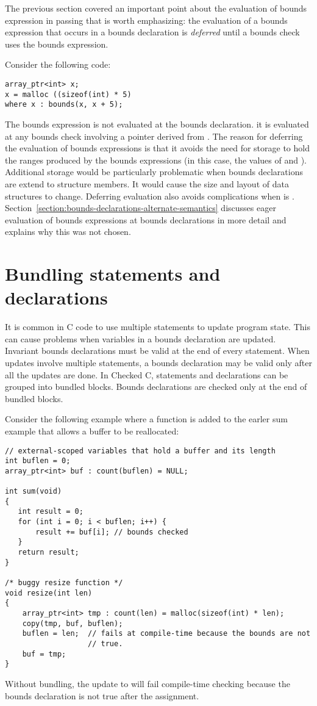 The previous section covered an important point about the evaluation of
bounds expression in passing that is worth emphasizing:
the evaluation of a bounds expression that occurs in
a bounds declaration is {\em deferred} until a bounds check uses the
bounds expression.

Consider the following code:

\begin{lstlisting}
array_ptr<int> x;
x = malloc ((sizeof(int) * 5)
where x : bounds(x, x + 5);
\end{lstlisting}

The bounds expression  is not evaluated at the
bounds declaration.   it is evaluated at any bounds check involving a
pointer derived from .  The reason for deferring the
evaluation of bounds expressions is that it avoids the need for
storage to hold the ranges produced by the bounds
expressions (in this case, the values of  and ).
Additional storage would be particularly
problematic when bounds declarations are extend to structure members.
It would cause the size and layout of data structures to change.
Deferring evaluation also avoids complications when  is
. Section~\ref{section:bounds-declarations-alternate-semantics} 
discusses eager evaluation of bounds expressions at
bounds declarations in more detail and explains why this was not chosen.

\section{Bundling statements and declarations}

It is common in C code to use multiple statements to update program state.
This can cause problems when variables in a bounds declaration are updated.
Invariant bounds declarations must be valid at the end of every statement.
When updates involve multiple statements, a bounds declaration may be valid only
after all the updates are done.  In Checked C, statements and declarations can be 
grouped into bundled blocks.  Bounds declarations are checked only at the end of bundled blocks.

Consider the following example where a function is added to the earler sum
example that allows a buffer to be reallocated:
\begin{lstlisting}
// external-scoped variables that hold a buffer and its length
int buflen = 0;
array_ptr<int> buf : count(buflen) = NULL;

int sum(void)
{
   int result = 0;
   for (int i = 0; i < buflen; i++) {
       result += buf[i]; // bounds checked
   }
   return result;
}

/* buggy resize function */
void resize(int len) 
{
    array_ptr<int> tmp : count(len) = malloc(sizeof(int) * len);
    copy(tmp, buf, buflen);
    buflen = len;  // fails at compile-time because the bounds are not
                   // true.
    buf = tmp;
}
\end{lstlisting}
Without bundling, the update to  will fail
compile-time checking because the bounds declaration is not true after the
assignment.

